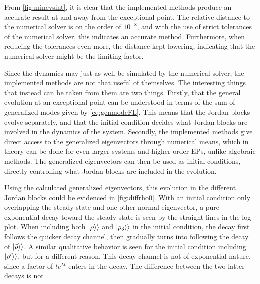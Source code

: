 \documentclass[../main.tex]{subfiles}
\begin{document}
From \cref{fig:minevsint}, it is clear that the implemented methods produce an accurate result at and away from the exceptional point. The relative distance to the numerical solver is on the order of $10^{-8}$, and with the use of strict tolerances of the numerical solver, this indicates an accurate method. Furthermore, when reducing the tolerances even more, the distance kept lowering, indicating that the numerical solver might be the limiting factor.

Since the dynamics may just as well be simulated by the numerical solver, the implemented methods are not that useful of themselves. The interesting things that instead can be taken from them are two things. Firstly, that the general evolution at an exceptional point can be understood in terms of the sum of generalized modes given by \cref{eq:genmodeFL}. This means that the Jordan blocks evolve separately, and that the initial condition decides what Jordan blocks are involved in the dynamics of the system. Secondly, the implemented methods give direct access to the generalized eigenvectors through numerical means, which in theory can be done for even larger systems and higher order EPs, unlike algebraic methods. The generalized eigenvectors can then be used as initial conditions, directly controlling what Jordan blocks are included in the evolution.

Using the calculated generalized eigenvectors, this evolution in the different Jordan blocks could be evidenced in \cref{fig:diffrho0}. With an initial condition only overlapping the steady state and one other normal eigenvector, a pure exponential decay toward the steady state is seen by the straight lines in the log plot. When including both $\ket{\bar \rho}\rangle$ and $\ket{\rho_3}\rangle$ in the initial condition, the decay first follows the quicker decay channel, then gradually turns into following the decay of $\ket{\bar\rho}\rangle$. A similar qualitative behavior is seen for the initial condition including $\ket{\rho'}\rangle$, but for a different reason. This decay channel is not of exponential nature, since a factor of $te^{\bar\lambda t}$ enters in the decay. The difference between the two latter decays is not 
\end{document}
